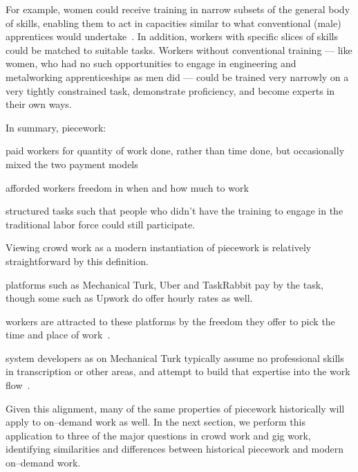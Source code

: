 \documentclass[trackingWork]{subfiles}
\begin{document}
For example, women could receive training in narrow subsets of the general body of skills, enabling them to act in capacities similar to what conventional (male) apprentices would undertake~\cite{hart2013rise}.
In addition, workers with specific slices of skills could be matched to suitable tasks.
Workers without conventional training
--- like women, who had no such opportunities
to engage in engineering and metalworking apprenticeships as men did ---
could be trained very narrowly on a very tightly constrained task,
demonstrate proficiency, and become experts in their own ways.

In summary, piecework:
\begin{inlinelist}[itemjoin*={;~and~},itemjoin={;~}]
  \item paid workers for quantity of work done, rather than time done,
        but occasionally mixed the two payment models
  \item afforded workers freedom in when and how much to work
  \item structured tasks such that people who didn't have the training
        to engage in the traditional labor force could still participate.
\end{inlinelist}

Viewing crowd work as a modern instantiation of piecework is relatively straightforward by this definition.
\begin{Numberlist}
\item platforms such as Mechanical Turk, Uber and TaskRabbit pay by the task, though some such as Upwork do offer hourly rates as well.
\item workers are attracted to these platforms by the freedom they offer to pick the time and place of work~\cite{martin2014being,whyWouldAnyoneBrewer}.
\item system developers as on Mechanical Turk typically assume no professional skills in transcription or other areas, and attempt to build that expertise into the work flow~\cite{noronha2011platemate,bernsteinSoylent}.
\end{Numberlist}
Given this alignment, many of the same properties of piecework historically will apply to on--demand work as well. 
In the next section, we perform this application to three of the major questions in crowd work and gig work, identifying similarities and differences between historical piecework and modern on--demand work.
\end{document}
